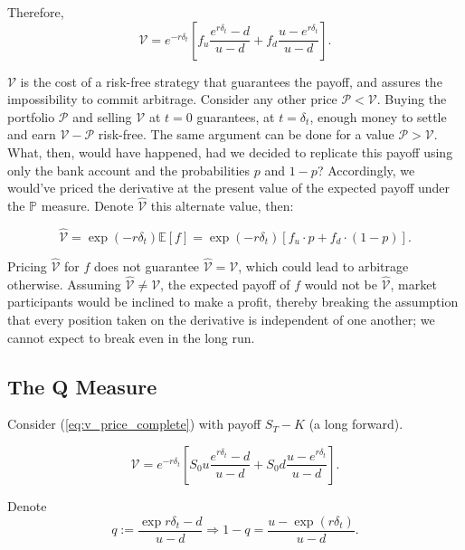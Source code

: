 \documentclass[../TGMAFFIRO.tex]{subfiles}
\begin{document}
Therefore,
\begin{equation} \label{eq:v_price_complete}
	\mathcal{V} = e^{-r\delta_t}\left[f_u \frac{e^{r\delta_t} - d}{u - d} + f_d \frac{u - e^{r\delta_t}}{u-d}\right].
\end{equation}

$\mathcal{V}$ is the cost of a risk-free strategy that guarantees the payoff, and assures the impossibility to commit arbitrage. Consider any other price $\mathcal{P} < \mathcal{V}$. Buying the portfolio $\mathcal{P}$ and selling $\mathcal{V}$ at $t=0$ guarantees, at $t=\delta_t$, enough money to settle and earn $\mathcal{V}-\mathcal{P}$ risk-free. The same argument can be done for a value $\mathcal{P} > \mathcal{V}$.\\

What, then, would have happened, had we decided to replicate this payoff using only the bank account and the probabilities $p$ and $1-p$? Accordingly, we would've priced the derivative at the present value of the expected payoff under the $\mathbb{P}$ measure. Denote $\hat{\mathcal{V}}$ this alternate value, then:

\begin{equation}
    \hat{\mathcal{V}} = \exp(-r\delta_t)\mathbb{E}[f] = \exp(-r\delta_t)[f_u \cdot p + f_d \cdot (1- p) ].
\end{equation}


Pricing $\hat{\mathcal{V}}$ for $f$ does not guarantee $\hat{\mathcal{V}} = \mathcal{V}$, which could lead to arbitrage otherwise. Assuming $\hat{\mathcal{V}} \neq \mathcal{V}$, the expected payoff of $f$ would not be $\hat{\mathcal{V}}$, market participants would be inclined to make a profit, thereby breaking the assumption that every position taken on the derivative is independent of one another; we cannot expect to break even in the long run.

\subsection{The Q Measure}
Consider  (\ref{eq:v_price_complete}) with payoff $S_T - K$ (a long forward).

\begin{equation*}
    \mathcal{V} = e^{-r\delta_t}\left[S_0u \frac{e^{r\delta_t} - d}{u - d} + S_0d \frac{u - e^{r\delta_t}}{u-d}\right].
\end{equation*}

Denote
\begin{equation}
    q:= \frac{\exp{r\delta_t} - d}{u - d} \Longrightarrow 1-q = \frac{u - \exp{(r\delta_t)}}{u-d}.
\end{equation}\\
\end{document}
